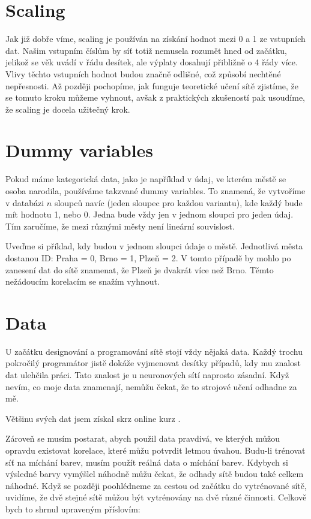 \documentclass[12pt,a4paper]{report}
\begin{document}
	\section{Scaling}
	Jak již dobře víme, scaling je používán na získání hodnot mezi 0 a 1 ze vstupních dat. Našim vstupním číslům by síť totiž nemusela rozumět hned od začátku, jelikož se věk uvádí v řádu desítek, ale výplaty dosahují přibližně o 4 řády více. Vlivy těchto vstupních hodnot budou značně odlišné, což způsobí nechtěné nepřesnosti. Až později pochopíme, jak funguje teoretické učení sítě zjistíme, že se tomuto kroku můžeme vyhnout, avšak z praktických zkušeností pak usoudíme, že scaling je docela užitečný krok.
	\section{Dummy variables}
	Pokud máme kategorická data, jako je například v údaj, ve kterém městě se osoba narodila, používáme takzvané dummy variables. To znamená, že vytvoříme v databázi $n$ sloupců navíc (jeden sloupec pro každou variantu), kde každý bude mít hodnotu 1, nebo 0. Jedna bude vždy jen v jednom sloupci pro jeden údaj. Tím zaručíme, že mezi různými městy není lineární souvislost.
	
	Uveďme si příklad, kdy budou v jednom sloupci údaje o městě. Jednotlivá města dostanou ID: Praha = 0, Brno = 1, Plzeň = 2. V tomto případě by mohlo po zanesení dat do sítě znamenat, že Plzeň je dvakrát více než Brno. Těmto nežádoucím korelacím se snažím vyhnout.
	\section{Data}
	U začátku designování a programování sítě stojí vždy nějaká data. Každý trochu pokročilý programátor jistě dokáže vyjmenovat desítky případů, kdy mu znalost dat ulehčila práci. Tato znalost je u neuronových sítí naprosto zásadní. Když nevím, co moje data znamenají, nemůžu čekat, že to strojové učení odhadne za mě.
	
	Většinu svých dat jsem získal skrz online kurz \cite{eremenko}.
	
	Zároveň se musím postarat, abych použil data pravdivá, ve kterých můžou opravdu existovat korelace, které můžu potvrdit letmou úvahou. Budu-li trénovat síť na míchání barev, musím použít reálná data o míchání barev. Kdybych si výsledné barvy vymýšlel náhodně můžu čekat, že odhady sítě budou také celkem náhodné. Když se později poohlédneme za cestou od začátku do vytrénované sítě, uvidíme, že dvě stejné sítě můžou být vytrénovány na dvě různé činnosti. Celkově bych to shrnul upraveným příslovím: 
\end{document}
